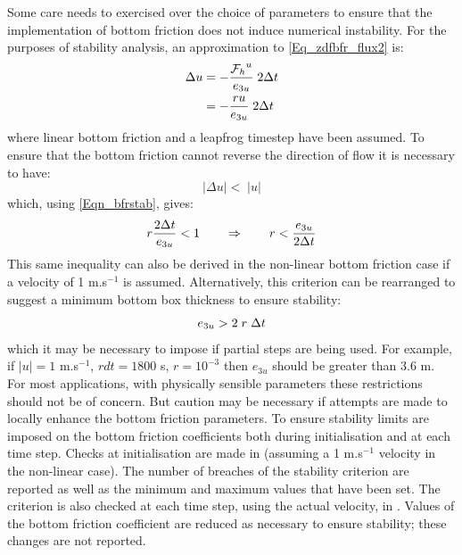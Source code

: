 Some care needs to exercised over the choice of parameters to ensure that the
implementation of bottom friction does not induce numerical instability. For 
the purposes of stability analysis, an approximation to \eqref{Eq_zdfbfr_flux2}
is:
\begin{equation} \label{Eqn_bfrstab}
\begin{split}
 \Delta u &= -\frac{{{\cal F}_h}^u}{e_{3u}}\;2 \Delta t    \\
               &= -\frac{ru}{e_{3u}}\;2\Delta t\\
\end{split}
\end{equation}
\noindent where linear bottom friction and a leapfrog timestep have been assumed. 
To ensure that the bottom friction cannot reverse the direction of flow it is necessary to have:
\begin{equation}
 |\Delta u| < \;|u| 
\end{equation}
\noindent which, using \eqref{Eqn_bfrstab}, gives:
\begin{equation}
r\frac{2\Delta t}{e_{3u}} < 1 \qquad  \Rightarrow \qquad r < \frac{e_{3u}}{2\Delta t}\\
\end{equation}
This same inequality can also be derived in the non-linear bottom friction case 
if a velocity of 1 m.s$^{-1}$ is assumed. Alternatively, this criterion can be 
rearranged to suggest a minimum bottom box thickness to ensure stability:
\begin{equation}
e_{3u} > 2\;r\;\Delta t
\end{equation}
\noindent which it may be necessary to impose if partial steps are being used. 
For example, if $|u| = 1$ m.s$^{-1}$, $rdt = 1800$ s, $r = 10^{-3}$ then
$e_{3u}$ should be greater than 3.6 m. For most applications, with physically
sensible parameters these restrictions should not be of concern. But 
caution may be necessary if attempts are made to locally enhance the bottom
friction parameters. 
To ensure stability limits are imposed on the bottom friction coefficients both during 
initialisation and at each time step. Checks at initialisation are made in  
(assuming a 1 m.s$^{-1}$ velocity in the non-linear case).
The number of breaches of the stability criterion are reported as well as the minimum 
and maximum values that have been set. The criterion is also checked at each time step, 
using the actual velocity, in . Values of the bottom friction coefficient are 
reduced as necessary to ensure stability; these changes are not reported.


